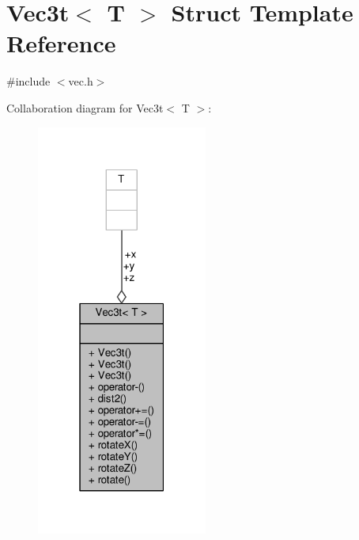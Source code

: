 \hypertarget{structVec3t}{}\section{Vec3t$<$ T $>$ Struct Template Reference}
\label{structVec3t}


{\ttfamily \#include $<$vec.\+h$>$}



Collaboration diagram for Vec3t$<$ T $>$\+:
\nopagebreak
\begin{figure}[H]
\begin{center}
\leavevmode
\includegraphics[width=159pt]{structVec3t__coll__graph}
\end{center}
\end{figure}
